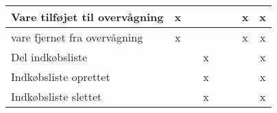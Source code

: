\begin{table}[h]
\begin{tabular}{|l|l|c|c|c|c|c|c|c|}
\multicolumn{2}{|l|}{Vare tilføjet til overvågning} & x                           &                            &                                   &                           &                               & x                         & x                           \\ \hline
\multicolumn{2}{|l|}{vare fjernet fra overvågning}  & x                           &                            &                                   &                           &                               & x                         & x                           \\ \hline
\multicolumn{2}{|l|}{Del indkøbsliste}              &                             &                            & x                                 &                           &                               &                           & x                           \\ \hline
\multicolumn{2}{|l|}{Indkøbsliste oprettet}         &                             &                            & x                                 &                           &                               &                           & x                           \\ \hline
\multicolumn{2}{|l|}{Indkøbsliste slettet}          &                             &                            & x                                 &                           &                               &                           & x                           \\ \hline
\end{tabular}
\end{table}